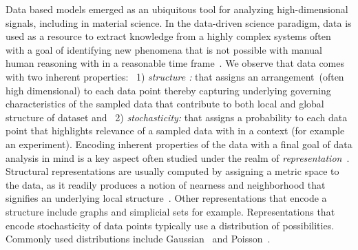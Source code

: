 Data based models emerged as an ubiquitous tool for analyzing high-dimensional signals, including in material science. In the data-driven science paradigm, data is used as a resource to extract knowledge from a highly complex systems often with a goal of identifying new phenomena that is not possible with manual human reasoning with in a reasonable time frame~\cite{brunton2019data}. We observe that data comes with two inherent properties: ~1) \textit{structure :} that assigns an arrangement~(often high dimensional) to each data point thereby capturing underlying governing characteristics of the sampled data that contribute to both local and global structure of dataset and ~2) \textit{stochasticity:} that assigns a probability to each data point that highlights relevance of a sampled data with in a context (for example an experiment). Encoding inherent properties of the data with a final goal of data analysis in mind is a key aspect often studied under the realm of \textit{representation}~\cite{bengio2013representation}. Structural representations are usually computed by assigning a metric space to the data, as it readily produces a notion of nearness and neighborhood that signifies an underlying local structure~\cite{mcinnes2018umap}. Other representations that encode a structure include graphs and simplicial sets for example. Representations that encode stochasticity of data points typically use a distribution of possibilities. Commonly used distributions include Gaussian~\cite{gardner2015bayesian,gavaghan2018use} and Poisson~\cite{flory1940molecular}.



